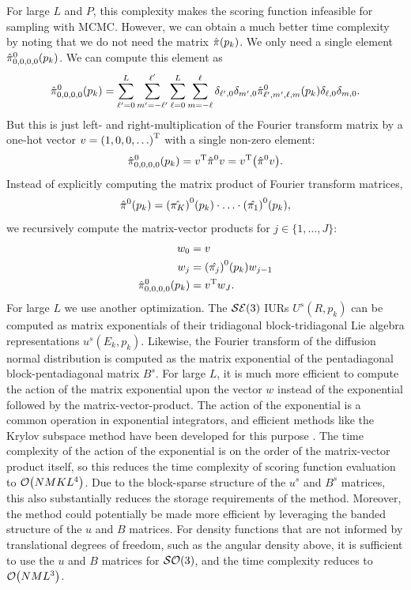 \documentclass[../../main.tex]{subfiles}
\begin{document}
\begin{refsection}
	For large $L$ and $P$, this complexity makes the scoring function infeasible for sampling with MCMC.
	However, we can obtain a much better time complexity by noting that we do not need the matrix $\hat{\pi}(p_k)$.
	We only need a single element $\hat{\pi}^0_{0,0,0,0}(p_k)$.
	We can compute this element as
	$$\hat{\pi}^0_{0,0,0,0}(p_k) = \sum_{\ell'=0}^L \sum_{m'=-\ell'}^{\ell'} \sum_{\ell=0}^L \sum_{m=-\ell}^{\ell} \delta_{\ell',0} \delta_{m',0} \hat{\pi}^0_{\ell',m',\ell,m}(p_k) \delta_{\ell,0} \delta_{m,0}.$$
	But this is just left- and right-multiplication of the Fourier transform matrix by a one-hot vector $v = {\qty(1, 0, 0, \ldots)}^\mathrm{T}$ with a single non-zero element:
	$$\hat{\pi}^0_{0,0,0,0}(p_k) = {v}^\mathrm{T} \hat{\pi}^0 v = {v}^\mathrm{T} \qty(\hat{\pi}^0 v).$$
	Instead of explicitly computing the matrix product of Fourier transform matrices,
	$$\hat{\pi}^0(p_k) = \qty(\hat{\pi_K})^0(p_k) \cdot \ldots \cdot \qty(\hat{\pi_1})^0(p_k),$$
	we recursively compute the matrix-vector products for $j \in \{1, \ldots, J\}$:
	\begin{align*}
		w_0 & = v                                     \\
		w_j & = \qty(\hat{\pi_{j}})^0(p_k) w_{j - 1} \\
		\hat{\pi}^0_{0,0,0,0}(p_k)
		    & = {v}^\mathrm{T} w_J.
	\end{align*}
	For large $L$ we use another optimization.
	The $\mathcal{SE} (3)$ IURs $U^s(R, p_k)$ can be computed as matrix exponentials of their tridiagonal block-tridiagonal Lie algebra representations $u^s(E_k, p_k)$.
	Likewise, the Fourier transform of the diffusion normal distribution is computed as the matrix exponential of the pentadiagonal block-pentadiagonal matrix $B^s$.
	For large $L$, it is much more efficient to compute the action of the matrix exponential upon the vector $w$ instead of the exponential followed by the matrix-vector-product.
	The action of the exponential is a common operation in exponential integrators, and efficient methods like the Krylov subspace method have been developed for this purpose \supercite{al-mohyComputingActionMatrix2011}.
	The time complexity of the action of the exponential is on the order of the matrix-vector product itself, so this reduces the time complexity of scoring function evaluation to $\order{NMKL^4}$.
	Due to the block-sparse structure of the $u^s$ and $B^s$ matrices, this also substantially reduces the storage requirements of the method.
	Moreover, the method could potentially be made more efficient by leveraging the banded structure of the $u$ and $B$ matrices.
	For density functions that are not informed by translational degrees of freedom, such as the angular density above, it is sufficient to use the $u$ and $B$ matrices for $\mathcal{SO} (3)$, and the time complexity reduces to $\order{NML^3}$.


\end{refsection}
\end{document}
